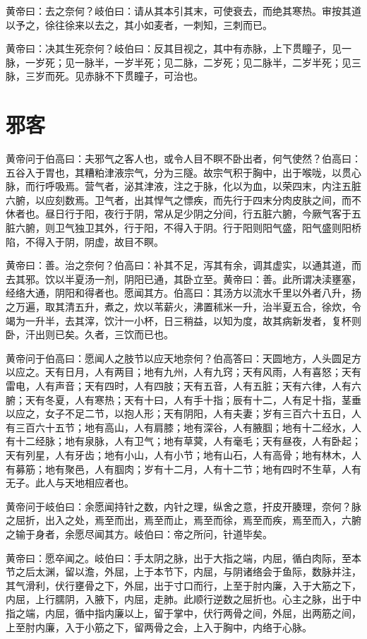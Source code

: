 \documentclass[12pt,UTF8]{ctexbook}
\begin{document}
	黄帝曰：去之奈何？岐伯曰：请从其本引其末，可使衰去，而绝其寒热。审按其道以予之，徐往徐来以去之，其小如麦者，一刺知，三刺而已。
	
	黄帝曰：决其生死奈何？岐伯曰：反其目视之，其中有赤脉，上下贯瞳子，见一脉，一岁死；见一脉半，一岁半死；见二脉，二岁死；见二脉半，二岁半死；见三脉，三岁而死。见赤脉不下贯瞳子，可治也。
	
	\chapter{邪客}
	
	黄帝问于伯高曰：夫邪气之客人也，或令人目不瞑不卧出者，何气使然？伯高曰：五谷入于胃也，其糟粕津液宗气，分为三隧。故宗气积于胸中，出于喉咙，以贯心脉，而行呼吸焉。营气者，泌其津液，注之于脉，化以为血，以荣四末，内注五脏六腑，以应刻数焉。卫气者，出其悍气之慓疾，而先行于四末分肉皮肤之间，而不休者也。昼日行于阳，夜行于阴，常从足少阴之分间，行五脏六腑，今厥气客于五脏六腑，则卫气独卫其外，行于阳，不得入于阴。行于阳则阳气盛，阳气盛则阳桥陷，不得入于阴，阴虚，故目不瞑。
	
	黄帝曰：善。治之奈何？伯高曰：补其不足，泻其有余，调其虚实，以通其道，而去其邪。饮以半夏汤一剂，阴阳已通，其卧立至。黄帝曰：善。此所谓决渎壅塞，经络大通，阴阳和得者也。愿闻其方。伯高曰：其汤方以流水千里以外者八升，扬之万遍，取其清五升，煮之，炊以苇薪火，沸置秫米一升，治半夏五合，徐炊，令竭为一升半，去其滓，饮汁一小杯，日三稍益，以知为度，故其病新发者，复杯则卧，汗出则已矣。久者，三饮而已也。
	
	黄帝问于伯高曰：愿闻人之肢节以应天地奈何？伯高答曰：天圆地方，人头圆足方以应之。天有日月，人有两目；地有九州，人有九窍；天有风雨，人有喜怒；天有雷电，人有声音；天有四时，人有四肢；天有五音，人有五脏；天有六律，人有六腑；天有冬夏，人有寒热；天有十曰，人有手十指；辰有十二，人有足十指，茎垂以应之，女子不足二节，以抱人形；天有阴阳，人有夫妻；岁有三百六十五日，人有三百六十五节；地有高山，人有肩膝；地有深谷，人有腋腘；地有十二经水，人有十二经脉；地有泉脉，人有卫气；地有草蓂，人有毫毛；天有昼夜，人有卧起；天有列星，人有牙齿；地有小山，人有小节；地有山石，人有高骨；地有林木，人有募筋；地有聚邑，人有腘肉；岁有十二月，人有十二节；地有四时不生草，人有无子。此人与天地相应者也。
	
	黄帝问于岐伯曰：余愿闻持针之数，内针之理，纵舍之意，扞皮开腠理，奈何？脉之屈折，出入之处，焉至而出，焉至而止，焉至而徐，焉至而疾，焉至而入，六腑之输于身者，余愿尽闻其方。岐伯曰：帝之所问，针道毕矣。
	
	黄帝曰：愿卒闻之。岐伯曰：手太阴之脉，出于大指之端，内屈，循白肉际，至本节之后太渊，留以澹，外屈，上于本节下，内屈，与阴诸络会于鱼际，数脉并注，其气滑利，伏行壅骨之下，外屈，出于寸口而行，上至于肘内廉，入于大筋之下，内屈，上行臑阴，入腋下，内屈，走肺。此顺行逆数之屈折也。心主之脉，出于中指之端，内屈，循中指内廉以上，留于掌中，伏行两骨之间，外屈，出两筋之间，上至肘内廉，入于小筋之下，留两骨之会，上入于胸中，内络于心脉。
	
\end{document}
